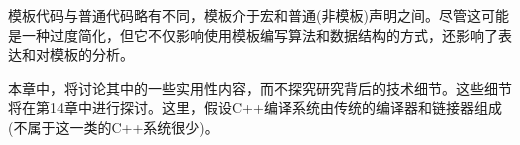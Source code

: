 模板代码与普通代码略有不同，模板介于宏和普通(非模板)声明之间。尽管这可能是一种过度简化，但它不仅影响使用模板编写算法和数据结构的方式，还影响了表达和对模板的分析。

本章中，将讨论其中的一些实用性内容，而不探究研究背后的技术细节。这些细节将在第14章中进行探讨。这里，假设C++编译系统由传统的编译器和链接器组成(不属于这一类的C++系统很少)。